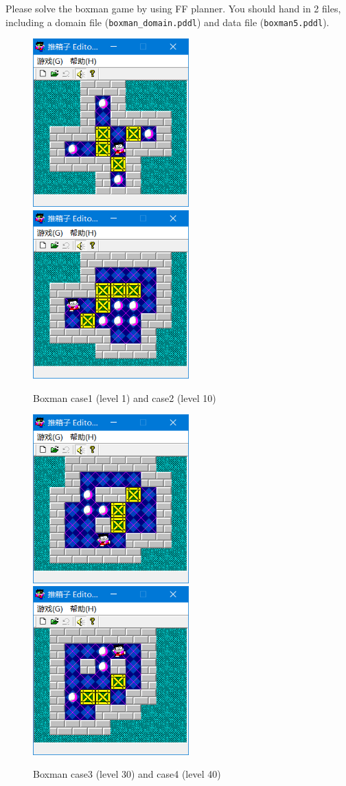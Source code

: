 \documentclass[a4paper, 11pt]{article}
\begin{document}
Please solve the boxman game by using FF planner. You should hand in 2 files, including a domain file (\texttt{boxman\_domain.pddl}) and data file (\texttt{boxman5.pddl}).
\begin{figure}[h]
  \centering
  \includegraphics[width=6cm]{fig/case1}
  \qquad
  \includegraphics[width=6cm]{fig/case2}
  \caption{Boxman case1 (level 1) and case2 (level 10)}
\end{figure}
\begin{figure}[h]
  \centering
  \includegraphics[width=6cm]{fig/case3}
  \qquad
  \includegraphics[width=6cm]{fig/case4}
  \caption{Boxman case3 (level 30) and case4 (level 40)}
\end{figure}
\end{document}
